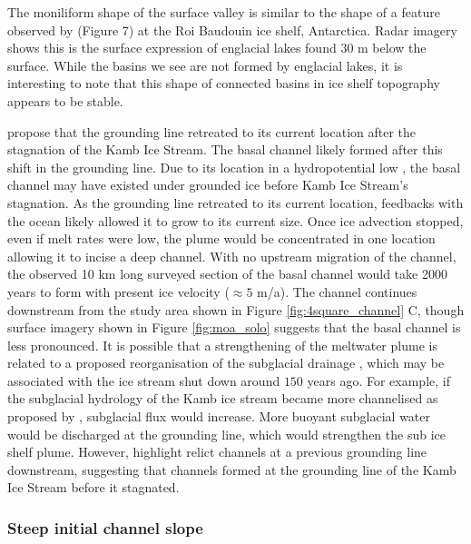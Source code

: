 The moniliform shape of the surface valley is similar to the shape of a feature observed by \cite{berger2017detecting} (Figure 7) at the Roi Baudouin ice shelf, Antarctica. Radar imagery shows this is the surface expression of englacial lakes found 30 m below the surface. While the basins we see are not formed by englacial lakes, it is interesting to note that this shape of connected basins in ice shelf topography appears to be stable. 

\cite{horgan2017poststagnation} propose that the grounding line retreated to its current location after the stagnation of the Kamb Ice Stream. The basal channel likely formed after this shift in the grounding line. 
Due to its location in a hydropotential low \citep{le2009subglacial}, the basal channel may have existed under grounded ice before Kamb Ice Stream's stagnation. As the grounding line retreated to its current location, feedbacks with the ocean likely allowed it to grow to its current size. Once ice advection stopped, even if  melt rates were low, the plume would be concentrated in one location allowing it to incise a deep channel. With no upstream migration of the channel, the observed 10 km long surveyed section of the basal channel would take 2000 years to form with present ice velocity ($\approx 5$ m/a). The channel continues downstream from the study area shown in Figure \ref{fig:4square_channel} C, though surface imagery shown in Figure \ref{fig:moa_solo} suggests that the basal channel is less pronounced.
It is possible that a strengthening of the meltwater plume is related to a proposed reorganisation of the subglacial drainage \cite [e.g.][] {anandakrishnan1997stagnation}, which may be associated with the ice stream shut down around $150$ years ago. For example, if the subglacial hydrology of the Kamb ice stream became more channelised as proposed by \cite{lelandais2018modelled}, subglacial flux would increase. More buoyant subglacial water would be discharged at the grounding line, which would strengthen the sub ice shelf plume.  
However, \cite{horgan2017poststagnation} highlight relict channels at a previous grounding line downstream, suggesting that channels formed at the grounding line of the Kamb Ice Stream before it stagnated.


\subsubsection{Steep initial channel slope} \label{sec:steep}


